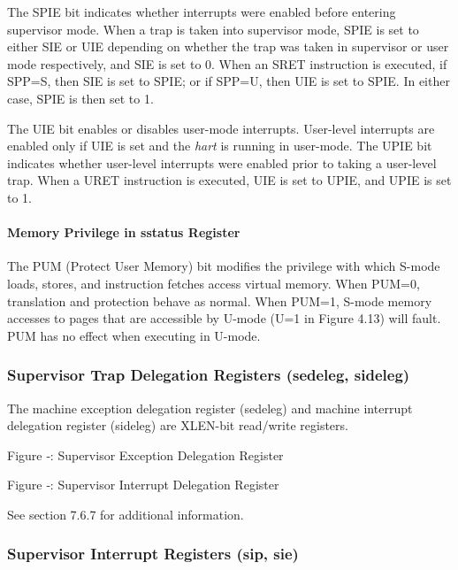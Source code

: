 The SPIE bit indicates whether interrupts were enabled before entering
supervisor mode. When a trap is taken into supervisor mode, SPIE is set
to either SIE or UIE depending on whether the trap was taken in
supervisor or user mode respectively, and SIE is set to 0. When an SRET
instruction is executed, if SPP=S, then SIE is set to SPIE; or if SPP=U,
then UIE is set to SPIE. In either case, SPIE is then set to 1.

The UIE bit enables or disables user-mode interrupts. User-level
interrupts are enabled only if UIE is set and the \emph{hart} is running
in user-mode. The UPIE bit indicates whether user-level interrupts were
enabled prior to taking a user-level trap. When a URET instruction is
executed, UIE is set to UPIE, and UPIE is set to 1.

\paragraph{Memory Privilege in sstatus Register
}\label{memory-privilege-in-sstatus-register}

The PUM (Protect User Memory) bit modifies the privilege with which
S-mode loads, stores, and instruction fetches access virtual memory.
When PUM=0, translation and protection behave as normal. When PUM=1,
S-mode memory accesses to pages that are accessible by U-mode (U=1 in
Figure 4.13) will fault. PUM has no effect when executing in U-mode.

\subsubsection{Supervisor Trap Delegation Registers (sedeleg,
sideleg)}\label{supervisor-trap-delegation-registers-sedeleg-sideleg}

The machine exception delegation register (sedeleg) and machine
interrupt delegation register (sideleg) are XLEN-bit read/write
registers.

\missingfigure{}

Figure ‑: Supervisor Exception Delegation Register

\missingfigure{}

Figure ‑: Supervisor Interrupt Delegation Register

See section 7.6.7 for additional information.

\subsubsection{Supervisor Interrupt Registers (sip, sie)}

